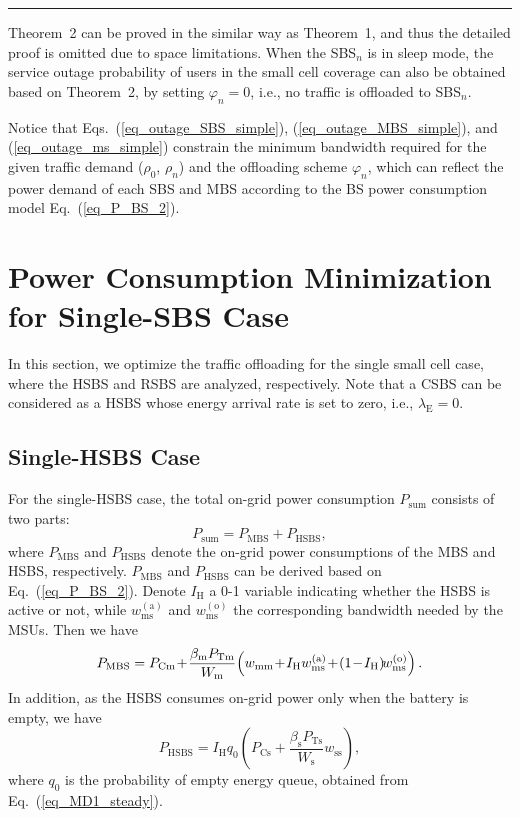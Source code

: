 \documentclass[12pt, draftclsnofoot,onecolumn]{IEEEtran}
\begin{document}
    \hfill \rule{4pt}{8pt}

Theorem~2 can be proved in the similar way as Theorem~1, and thus the detailed proof is omitted due to space limitations.
When the SBS$_n$ is in sleep mode, the service outage probability of users in the small cell coverage can also be obtained based on Theorem~2, by setting $\varphi_n=0$, i.e., no traffic is offloaded to SBS$_n$.

Notice that Eqs.~(\ref{eq_outage_SBS_simple}), (\ref{eq_outage_MBS_simple}), and (\ref{eq_outage_ms_simple}) constrain the minimum bandwidth required for the given traffic demand ($\rho_\mathrm{0}$, $\rho_{n}$) and the offloading scheme $\varphi_n$, which can reflect the power demand of each SBS and MBS according to the BS power consumption model Eq.~(\ref{eq_P_BS_2}).
 \section{Power Consumption Minimization for Single-SBS Case}
    \label{sec_Single_SBS}
    In this section, we optimize the traffic offloading for the single small cell case, where the HSBS and RSBS are analyzed, respectively.
Note that a CSBS can be considered as a HSBS whose energy arrival rate is set to zero, i.e., $\lambda_\mathrm{E}=0$.

\subsection{Single-HSBS Case}

For the single-HSBS case, the total on-grid power consumption $P_{\mathrm{sum}}$ consists of two parts:
\begin{equation}\label{eq_P_total_HSBS}
    P_{\mathrm{sum}} = P_\mathrm{MBS} + P_\mathrm{HSBS},
\end{equation}
where $P_\mathrm{MBS}$ and $P_\mathrm{HSBS}$ denote the on-grid power consumptions of the MBS and HSBS, respectively.
$P_\mathrm{MBS}$ and $P_\mathrm{HSBS}$ can be derived based on Eq.~(\ref{eq_P_BS_2}).
Denote $I_\mathrm{H}$ a 0-1 variable indicating whether the HSBS is active or not, while $w_\mathrm{ms}^{(\mathrm{a})}$ and $w_\mathrm{ms}^{(\mathrm{o})}$ the corresponding bandwidth needed by the MSUs.
Then we have
\begin{equation}\label{eq_sum_power_HSBS_detail} \small
    P_\mathrm{MBS} = P_{\mathrm{Cm}} \!+\! \frac{\beta_\mathrm{m}P_\mathrm{Tm}}{W_\mathrm{m}} \! \left( w_\mathrm{mm} \!+\! I_\mathrm{H} w_\mathrm{ms}^{(\mathrm{a})} \!+\! (1\!-\!I_\mathrm{H}) \! w_\mathrm{ms}^{(\mathrm{o})} \right).
\end{equation}
In addition, as the HSBS consumes on-grid power only when the battery is empty, we have
\begin{equation}\label{eq_sum_power_HSBS_detail_2}
    P_{\mathrm{HSBS}} = I_\mathrm{H} q_0 \left(P_{\mathrm{Cs}} + \frac{\beta_\mathrm{s}P_\mathrm{Ts}}{W_\mathrm{s}} w_\mathrm{ss} \right),
\end{equation}
where $q_0$ is the probability of empty energy queue, obtained from  Eq.~(\ref{eq_MD1_steady}).
\end{document}
